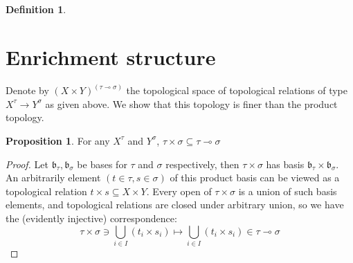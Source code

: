\documentclass{tufte-handout}
\theoremstyle{definition}
\newtheorem{proposition}[theorem]{Proposition}
\newtheorem{defn}[theorem]{Definition}
\newtheorem{remark}[theorem]{Remark}
\begin{document}
\marginnote{
    \begin{remark}

    \end{remark}
}

\begin{defn}

\end{defn}



\section{Enrichment structure}



Denote by $(X \times Y)^{(\tau \multimap \sigma)}$ the topological space of topological relations of type $X^\tau \rightarrow Y^\sigma$ as given above. We show that this topology is finer than the product topology.

\begin{proposition}
For any $X^\tau$ and $Y^\sigma$, $\tau \times \sigma \subseteq \tau \multimap \sigma$
\begin{proof}
Let $\mathfrak{b}_\tau, \mathfrak{b}_\sigma$ be bases for $\tau$ and $\sigma$ respectively, then $\tau \times \sigma$ has basis $\mathfrak{b}_\tau \times \mathfrak{b}_\sigma$. An arbitrarily element $(t \in \tau, s \in \sigma)$ of this product basis can be viewed as a topological relation $t \times s \subseteq X \times Y$. Every open of $\tau \times \sigma$ is a union of such basis elements, and topological relations are closed under arbitrary union, so we have the (evidently injective) correspondence:
\[ \tau \times \sigma \ni \bigcup\limits_{i \in I}(t_i \times s_i) \mapsto \bigcup\limits_{i \in I}(t_i \times s_i) \in \tau \multimap \sigma \]
\end{proof}
\end{proposition}
\end{document}

